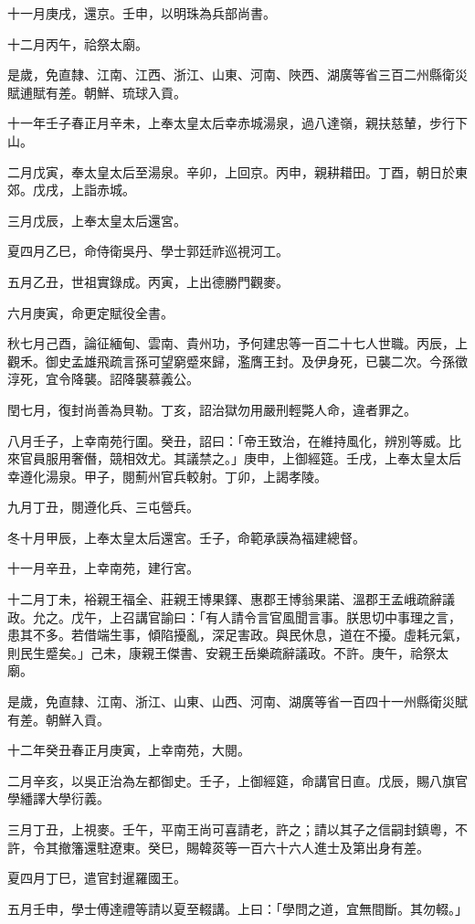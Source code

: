 \begin{pinyinscope}
十一月庚戌，還京。壬申，以明珠為兵部尚書。

十二月丙午，祫祭太廟。

是歲，免直隸、江南、江西、浙江、山東、河南、陜西、湖廣等省三百二州縣衛災賦逋賦有差。朝鮮、琉球入貢。

十一年壬子春正月辛未，上奉太皇太后幸赤城湯泉，過八達嶺，親扶慈輦，步行下山。

二月戊寅，奉太皇太后至湯泉。辛卯，上回京。丙申，親耕耤田。丁酉，朝日於東郊。戊戌，上詣赤城。

三月戊辰，上奉太皇太后還宮。

夏四月乙巳，命侍衛吳丹、學士郭廷祚巡視河工。

五月乙丑，世祖實錄成。丙寅，上出德勝門觀麥。

六月庚寅，命更定賦役全書。

秋七月己酉，論征緬甸、雲南、貴州功，予何建忠等一百二十七人世職。丙辰，上觀禾。御史孟雄飛疏言孫可望窮蹙來歸，濫膺王封。及伊身死，已襲二次。今孫徵淳死，宜令降襲。詔降襲慕義公。

閏七月，復封尚善為貝勒。丁亥，詔治獄勿用嚴刑輕斃人命，違者罪之。

八月壬子，上幸南苑行圍。癸丑，詔曰：「帝王致治，在維持風化，辨別等威。比來官員服用奢僭，競相效尤。其議禁之。」庚申，上御經筵。壬戌，上奉太皇太后幸遵化湯泉。甲子，閱薊州官兵較射。丁卯，上謁孝陵。

九月丁丑，閱遵化兵、三屯營兵。

冬十月甲辰，上奉太皇太后還宮。壬子，命範承謨為福建總督。

十一月辛丑，上幸南苑，建行宮。

十二月丁未，裕親王福全、莊親王博果鐸、惠郡王博翁果諾、溫郡王孟峨疏辭議政。允之。戊午，上召講官諭曰：「有人請令言官風聞言事。朕思切中事理之言，患其不多。若借端生事，傾陷擾亂，深足害政。與民休息，道在不擾。虛耗元氣，則民生蹙矣。」己未，康親王傑書、安親王岳樂疏辭議政。不許。庚午，祫祭太廟。

是歲，免直隸、江南、浙江、山東、山西、河南、湖廣等省一百四十一州縣衛災賦有差。朝鮮入貢。

十二年癸丑春正月庚寅，上幸南苑，大閱。

二月辛亥，以吳正治為左都御史。壬子，上御經筵，命講官日直。戊辰，賜八旗官學繙譯大學衍義。

三月丁丑，上視麥。壬午，平南王尚可喜請老，許之；請以其子之信嗣封鎮粵，不許，令其撤籓還駐遼東。癸巳，賜韓菼等一百六十六人進士及第出身有差。

夏四月丁巳，遣官封暹羅國王。

五月壬申，學士傅達禮等請以夏至輟講。上曰：「學問之道，宜無間斷。其勿輟。」


\end{pinyinscope}
